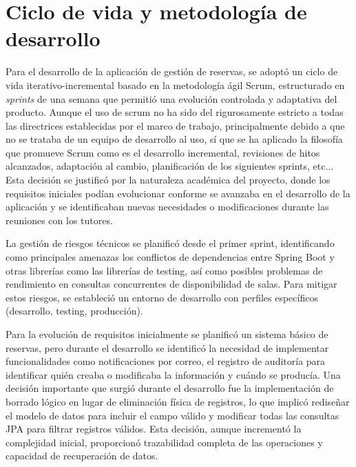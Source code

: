 
\section{Ciclo de vida y metodología de desarrollo}\label{ciclo-de-vida-metodologia-desarrollo}
Para el desarrollo de la aplicación de gestión de reservas, se adoptó un ciclo de vida iterativo-incremental basado en la metodología ágil Scrum, estructurado en \emph{sprints} de una semana que permitió una evolución controlada y adaptativa del producto. Aunque el uso de scrum no ha sido del rigurosamente estricto a todas las directrices establecidas por el marco de trabajo, principalmente debido a que no se trataba de un equipo de desarrollo al uso, sí que se ha aplicado la filosofía que promueve Scrum como es el desarrollo incremental, revisiones de hitos alcanzados, adaptación al cambio, planificación de los siguientes sprints, etc... Esta decisión se justificó por la naturaleza académica del proyecto, donde los requisitos iniciales podían evolucionar conforme se avanzaba en el desarrollo de la aplicación y se identificaban nuevas necesidades o modificaciones durante las reuniones con los tutores.

La gestión de riesgos técnicos se planificó desde el primer sprint, identificando como principales amenazas los conflictos de dependencias entre Spring Boot y otras librerías como las librerías de testing, así como posibles problemas de rendimiento en consultas concurrentes de disponibilidad de salas. Para mitigar estos riesgos, se estableció un entorno de desarrollo con perfiles específicos (desarrollo, testing, producción).

Para la evolución de requisitos inicialmente se planificó un sistema básico de reservas, pero durante el desarrollo se identificó la necesidad de implementar funcionalidades como notificaciones por correo, el registro de auditoría para identificar quién creaba o modificaba la información y cuándo se producía. 
Una decisión importante que surgió durante el desarrollo fue la implementación de borrado lógico en lugar de eliminación física de registros, lo que implicó rediseñar el modelo de datos para incluir el campo válido y modificar todas las consultas JPA para filtrar registros válidos. Esta decisión, aunque incrementó la complejidad inicial, proporcionó trazabilidad completa de las operaciones y capacidad de recuperación de datos.

